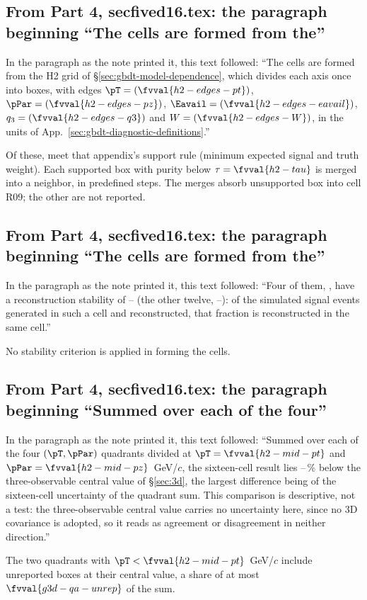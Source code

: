 \subsection{From Part 4, secfived16.tex: the paragraph beginning ``The cells are formed from the''}
In the paragraph as the note printed it, this text followed: ``The cells are formed from the H2 grid of \S\ref{sec:gbdt-model-dependence}, which divides each axis once into  boxes, with edges $\pT=(\fvval{h2-edges-pt})$, $\pPar=(\fvval{h2-edges-pz})$, $\Eavail=(\fvval{h2-edges-eavail})$, $q_3=(\fvval{h2-edges-q3})$ and $W=(\fvval{h2-edges-W})$, in the units of App.~\ref{sec:gbdt-diagnostic-definitions}.''\par
Of these,  meet that appendix's support rule (minimum expected signal and truth weight). Each supported box with purity below $\tau=\fvval{h2-tau}$ is merged into a neighbor, in  predefined steps. The merges absorb  unsupported box into cell R09; the other  are not reported.

\subsection{From Part 4, secfived16.tex: the paragraph beginning ``The cells are formed from the''}
In the paragraph as the note printed it, this text followed: ``Four of them, , have a reconstruction stability of -- (the other twelve, --): of the simulated signal events generated in such a cell and reconstructed, that fraction is reconstructed in the same cell.''\par
No stability criterion is applied in forming the cells.

\subsection{From Part 4, secfived16.tex: the paragraph beginning ``Summed over each of the four''}
In the paragraph as the note printed it, this text followed: ``Summed over each of the four $(\pT,\pPar)$ quadrants divided at $\pT=\fvval{h2-mid-pt}$ and $\pPar=\fvval{h2-mid-pz}$~GeV/$c$, the sixteen-cell result lies --\,\% below the three-observable central value of \S\ref{sec:3d}, the largest difference being  of the sixteen-cell uncertainty of the quadrant sum. This comparison is descriptive, not a test: the three-observable central value carries no uncertainty here, since no 3D covariance is adopted, so it reads as agreement or disagreement in neither direction.''\par
The two quadrants with $\pT<\fvval{h2-mid-pt}$~GeV/$c$ include unreported boxes at their central value, a share of at most $\fvval{g3d-qa-unrep}$ of the sum.

